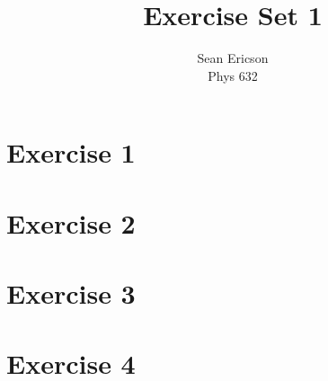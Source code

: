\documentclass[12pt]{article}
\begin{document}
	
\title{Exercise Set 1}
\author{Sean Ericson \\ Phys 632}
\maketitle

\section*{Exercise 1}



\section*{Exercise 2}




\section*{Exercise 3}
    


\section*{Exercise 4}
\end{document}

